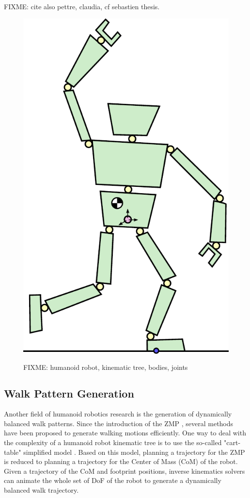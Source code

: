 FIXME: cite also pettre, claudia, cf sebastien thesis.

\begin{figure}
  \centering
      {\includegraphics[width = 0.6\linewidth]
        {src/robot.pdf}}
      \caption{FIXME: humanoid robot, kinematic tree, bodies, joints}
      \label{fig:chap1-robot}
\end{figure}

\subsection{Walk Pattern Generation}
\label{subsec:chap1-pattern-generator}

Another field of humanoid robotics research is the generation of
dynamically balanced walk patterns. Since the introduction of the ZMP
\cite{vukobratovic1969contribution}, several methods have been
proposed to generate walking motions efficiently.  One way to deal
with the complexity of a humanoid robot kinematic tree is to use the
so-called "cart-table" simplified model \cite{kaji03}. Based
on this model, planning a trajectory for the ZMP is reduced to
planning a trajectory for the Center of Mass (CoM) of the robot.
Given a trajectory of the CoM and footprint positions, inverse
kinematics solvers can animate the whole set of DoF of the robot to
generate a dynamically balanced walk trajectory.

